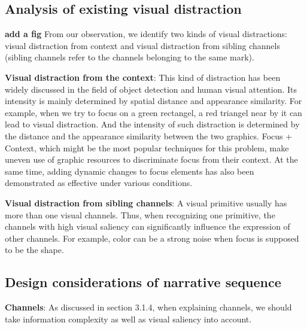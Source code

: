 \documentclass[review,journal]{vgtc}         %
\begin{document}
\subsection{Analysis of existing visual distraction}
\textbf{add a fig}
From our observation, we identify two kinds of visual distractions: visual distraction from context and visual distraction from sibling channels (sibling channels refer to the channels belonging to the same mark). \par
\textbf{Visual distraction from the context}: This kind of distraction has been widely discussed in the field of object detection and human visual attention. \cite{nothdurft_salience_2000, standage_modelling_2005}Its intensity is mainly  determined by spatial distance and appearance similarity. \cite{wolfe_guided_1994}For example, when we try to focus on a green rectangel, a red triangel near by it can lead to visual distraction. And the intensity of such distraction is determined by the distance and the appearance similarity between the two graphics. Focus + Context, which might be the most popular techniques for this problem, make uneven use of graphic resources to discriminate focus from their context. At the same time, adding dynamic changes to focus elements has also been demonstrated as effective under various conditions\cite{waldner_attractive_2014}. 

\textbf{Visual distraction from sibling channels}: A visual primitive usually has more than one visual channels. Thus, when recognizing one primitive, the channels with high visual saliency can significantly influence the expression of other channels. For example, color can be a strong noise when focus is supposed to be the shape.

\subsection{Design considerations of narrative sequence}
\textbf{Channels}: As discussed in section 3.1.4, when explaining channels, we should take information complexity as well as visual saliency into account. 
\end{document}
